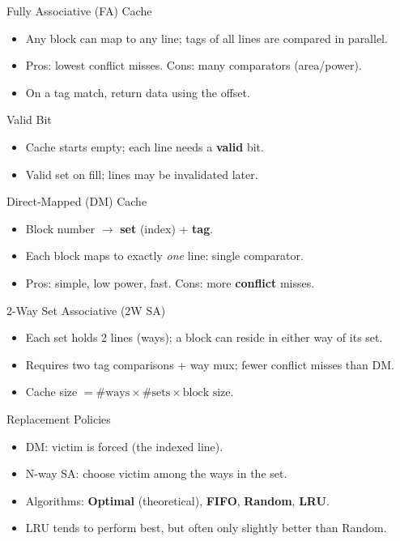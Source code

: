 \documentclass[aspectratio=169,12pt]{beamer}
\begin{document}
\begin{frame}{Fully Associative (FA) Cache}
\begin{itemize}
  \item Any block can map to any line; tags of all lines are compared in parallel.
  \item Pros: lowest conflict misses. Cons: many comparators (area/power).
  \item On a tag match, return data using the offset.
\end{itemize}
\end{frame}

\begin{frame}{Valid Bit}
\begin{itemize}
  \item Cache starts empty; each line needs a \textbf{valid} bit.
  \item Valid set on fill; lines may be invalidated later.
\end{itemize}
\end{frame}

\begin{frame}{Direct-Mapped (DM) Cache}
\begin{itemize}
  \item Block number $\rightarrow$ \textbf{set} (index) + \textbf{tag}.
  \item Each block maps to exactly \emph{one} line: single comparator.
  \item Pros: simple, low power, fast. Cons: more \textbf{conflict} misses.
\end{itemize}
\end{frame}

\begin{frame}{2-Way Set Associative (2W SA)}
\begin{itemize}
  \item Each set holds 2 lines (ways); a block can reside in either way of its set.
  \item Requires two tag comparisons + way mux; fewer conflict misses than DM.
  \item Cache size $=\#\text{ways}\times\#\text{sets}\times\text{block size}$.
\end{itemize}
\end{frame}

\begin{frame}{Replacement Policies}
\begin{itemize}
  \item DM: victim is forced (the indexed line).
  \item N-way SA: choose victim among the ways in the set.
  \item Algorithms: \textbf{Optimal} (theoretical), \textbf{FIFO}, \textbf{Random}, \textbf{LRU}.
  \item LRU tends to perform best, but often only slightly better than Random.
\end{itemize}
\end{frame}
\end{document}
